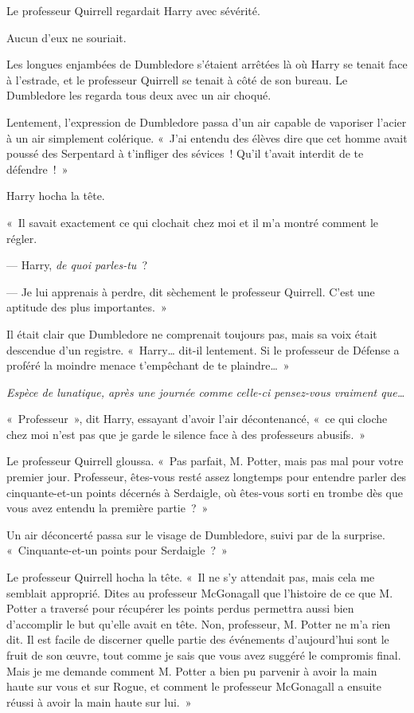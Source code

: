 Le professeur Quirrell regardait Harry avec sévérité.

Aucun d'eux ne souriait.

Les longues enjambées de Dumbledore s'étaient arrêtées là où Harry se tenait face à l'estrade, et le professeur Quirrell se tenait à côté de son bureau.
Le Dumbledore les regarda tous deux avec un air choqué.

Lentement, l'expression de Dumbledore passa d'un air capable de vaporiser l'acier à un air simplement colérique.
«~J'ai entendu des élèves dire que cet homme avait poussé des Serpentard à t'infliger des sévices~!
Qu'il t'avait interdit de te défendre~!~»

Harry hocha la tête.

«~Il savait exactement ce qui clochait chez moi et il m'a montré comment le régler.

--- Harry, \emph{de quoi parles-tu}~?

--- Je lui apprenais à perdre, dit sèchement le professeur Quirrell.
C'est une aptitude des plus importantes.~»

Il était clair que Dumbledore ne comprenait toujours pas, mais sa voix était descendue d'un registre.
«~Harry… dit-il lentement.
Si le professeur de Défense a proféré la moindre menace t'empêchant de te plaindre…~»

\emph{Espèce de lunatique, après une journée comme celle-ci pensez-vous vraiment que…}

«~Professeur~», dit Harry, essayant d'avoir l'air décontenancé, «~ce qui cloche chez moi n'est pas que je garde le silence face à des professeurs abusifs.~»

Le professeur Quirrell gloussa.
«~Pas parfait, M. Potter, mais pas mal pour votre premier jour.
Professeur, êtes-vous resté assez longtemps pour entendre parler des cinquante-et-un points décernés à Serdaigle, où êtes-vous sorti en trombe dès que vous avez entendu la première partie~?~»

Un air déconcerté passa sur le visage de Dumbledore, suivi par de la surprise.
«~Cinquante-et-un points pour Serdaigle~?~»

Le professeur Quirrell hocha la tête.
«~Il ne s'y attendait pas, mais cela me semblait approprié.
Dites au professeur McGonagall que l'histoire de ce que M. Potter a traversé pour récupérer les points perdus permettra aussi bien d'accomplir le but qu'elle avait en tête.
Non, professeur, M. Potter ne m'a rien dit.
Il est facile de discerner quelle partie des événements d'aujourd'hui sont le fruit de son œuvre, tout comme je sais que vous avez suggéré le compromis final.
Mais je me demande comment M. Potter a bien pu parvenir à avoir la main haute sur vous et sur Rogue, et comment le professeur McGonagall a ensuite réussi à avoir la main haute sur lui.~»


